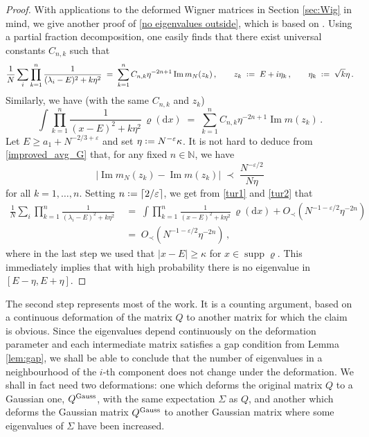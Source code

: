 \documentclass[11pt]{article} %
\numberwithin{equation}{section}
\numberwithin{figure}{section}
\theoremstyle{plain} %
\theoremstyle{definition} %
\newcommand{\txt}[1]{\text{\rm{#1}}}
\newcommand{\N}{\mathbb{N}}
\newcommand{\dd}{\mathrm{d}}
\newcommand*{\deq}{\mathrel{\vcenter{\baselineskip0.65ex \lineskiplimit0pt \hbox{.}\hbox{.}}}=}
\renewcommand{\geq}{\geqslant}
\renewcommand{\epsilon}{\varepsilon}
\newcommand{\ceil}[1]  {\lceil  {#1} \rceil}
\newcommand{\abs}[1]{\lvert #1 \rvert}
\newcommand{\absb}[1]{\bigl\lvert #1 \bigr\rvert}
\DeclareMathOperator{\supp}{supp}
\DeclareMathOperator{\im}{Im}
\newcommand{\be}{\begin{equation}}
\newcommand{\ee}{\end{equation}}
\begin{document}
\begin{proof}
With applications to the deformed Wigner matrices in Section \ref{sec:Wig} in mind, we give another proof of \eqref{no eigenvalues outside}, which is based on \cite[Section 6]{BS2}. Using a partial fraction decomposition, one easily finds that there exist universal constants $C_{n,k}$ such that
\be\label{tur1}
\frac1N\sum_i \prod_{k=1}^n \frac{1}{(\lambda_i-E)^2+k\eta^2} \;=\; \sum_{k=1}^n C_{n,k} \eta^{-2n+1} \im  m_N(z_k)\,, \qquad z_k \;\deq\; E+i\eta_k\,, \qquad \eta_k \;\deq\; \sqrt{k}\eta \,.
\ee
Similarly, we have (with the same $C_{n,k}$ and $z_k$)
\be\label{tur2}\int \prod_{k=1}^n \frac{1}{(x-E)^2+k\eta^2} \, \varrho(\dd x) \;=\; \sum_{k=1}^n C_{n,k} \eta^{-2n+1} \im  m (z_k)\,.
\ee
Let $E \geq a_1 + N^{-2/3 + \epsilon}$ and set $\eta \deq N^{-\epsilon} \kappa$. It is not hard to deduce from \eqref{improved_avg_G} that, for any fixed $n \in \N$, we have
\begin{equation}
\absb{\im  m_N (z_k)-\im  m (z_k)} \;\prec\;  \frac{N^{-\epsilon/2}}{N \eta}
\end{equation}
for all $k = 1, \dots, n$. Setting $n \deq \ceil{2/\epsilon}$, we get from \eqref{tur1} and \eqref{tur2} that
\begin{align*}
 \frac1N\sum_i \prod_{k=1}^n \frac{1}{(\lambda_i-E)^2+k\eta^2} &\;=\; \int  \prod_{k=1}^n \frac{1}{(x-E)^2+k\eta^2} \, \varrho(\dd x)
 + O_\prec(N^{-1-\epsilon/2}\eta^{-2n})
 \\
 &\;=\; O_\prec(N^{-1-\epsilon/2}\eta^{-2n})\,, 
\end{align*}
where in the last step we used that $\abs{x - E} \geq \kappa$ for $x \in \supp \varrho$. This immediately implies that with high probability there is no eigenvalue in $[E-\eta, E+\eta]$. 
\end{proof}

The second step represents most of the work. It is a counting argument, based on a continuous deformation of the matrix $Q$ to another matrix for which the claim is obvious. Since the eigenvalues depend continuously on the deformation parameter and each intermediate matrix satisfies a gap condition from Lemma \ref{lem:gap}, we shall be able to conclude that the number of eigenvalues in a neighbourhood of the $i$-th component does not change under the deformation. We shall in fact need two deformations: one which deforms the original matrix $Q$ to a Gaussian one, $Q^{\txt{Gauss}}$, with the same expectation $\Sigma$ as $Q$, and another which deforms the Gaussian matrix $Q^{\txt{Gauss}}$ to another Gaussian matrix where some eigenvalues of $\Sigma$ have been increased.
\end{document}
